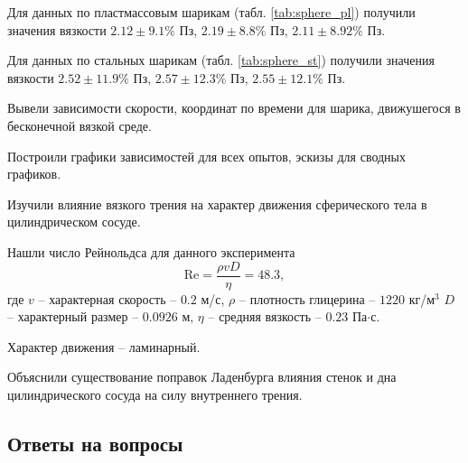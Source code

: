 \documentclass[a4paper,12pt]{article}
\begin{document}
Для данных по пластмассовым шарикам (табл. \ref{tab:sphere_pl}) получили значения вязкости $2.12\pm9.1\%$ Пз, $2.19\pm8.8\%$ Пз, $2.11\pm8.92\%$ Пз.

Для данных по стальных шарикам (табл. \ref{tab:sphere_st}) получили значения вязкости $2.52\pm11.9\%$ Пз, $2.57\pm12.3\%$ Пз, $2.55\pm12.1\%$ Пз.

Вывели зависимости скорости, координат по времени для шарика, движушегося в бесконечной вязкой среде.

Построили графики зависимостей для всех опытов, эскизы для сводных графиков.

Изучили влияние вязкого трения на характер движения сферического тела в цилиндрическом сосуде.

Нашли число Рейнольдса для данного эксперимента
\begin{equation}
	\mathrm{Re}=\frac{\rho vD}{\eta}=48.3,
\end{equation}
где $v$ -- характерная скорость -- $0.2$ м/с, $\rho$ -- плотность глицерина -- $1220$ кг/м$^3$ $D$ -- характерный размер -- $0.0926$ м, $\eta$ -- средняя вязкость -- $0.23$ Па$\cdot$с.

Характер движения -- ламинарный.

Объяснили существование поправок Ладенбурга влияния стенок и дна цилиндрического сосуда на силу внутреннего трения.


\newpage
\subsection*{Ответы на вопросы}
\end{document}
